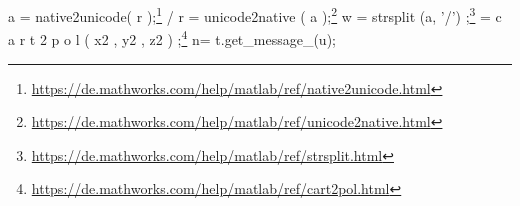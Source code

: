 \documentclass[12pt]{article}
\begin{document}
a = native2unicode( r );\footnote{\url{https://de.mathworks.com/help/matlab/ref/native2unicode.html}} 	/ r = unicode2native ( a );\footnote{\url{https://de.mathworks.com/help/matlab/ref/unicode2native.html}}
\newline
{}
\newline
w =  strsplit (a, '/') ;\footnote{\url{https://de.mathworks.com/help/matlab/ref/strsplit.html}}
\newline
{}
 = c a r t 2 p o l ( x2 , y2 , z2 ) ;\footnote{\url{https://de.mathworks.com/help/matlab/ref/cart2pol.html}}
\newline
{}
\newpage
n= t.get\_message\_(u);
\newline
\end{document}
